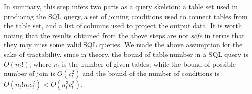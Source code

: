 In summary, this step infers two parts as a query skeleton: a table set used in producing the SQL query, a set of joining conditions
used to connect tables from the table set, and a list of columns used to project the output data.
It is worth noting that the results obtained from the above steps are not \textit{safe} in
terms that they may miss some valid SQL queries. We made the above assumption for the sake of tractability,
since in theory, the bound of table number in a SQL query is $O(n_t!)$, where $n_t$ is the number of given tables;
while the bound of possible number of join is $O(c_t^2)$ and the bound of the number of conditions is $O(n_t!n_tc_t^2)<O(n_t^3c_t^2)$.



